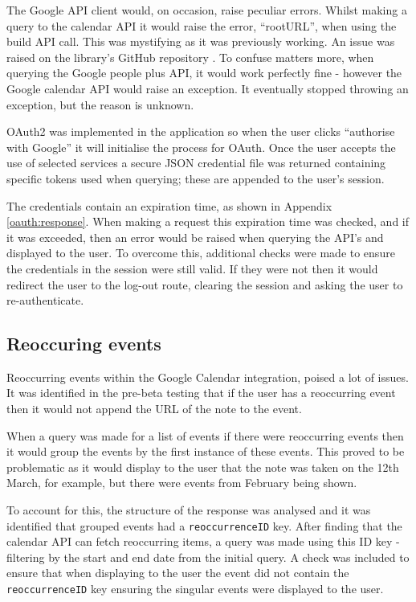 {{{{{{{The Google API client would, on occasion, raise peculiar errors. Whilst making a query to the calendar API it would raise the error, ``rootURL'', when using the build API call. This was mystifying as it was previously working. An issue was raised on the library's GitHub repository \cite{citeulike:14021433}. To confuse matters more, when querying the Google people plus API, it would work perfectly fine - however the Google calendar API would raise an exception. It eventually stopped throwing an exception, but the reason is unknown.

OAuth2 was implemented in the application so when the user clicks ``authorise with Google'' it will initialise the process for OAuth.
Once the user accepts the use of selected services a secure JSON credential file was returned containing specific tokens used when querying; these are appended to the user's session.

The credentials contain an expiration time, as shown in Appendix \ref{oauth:response}. When making a request this expiration time was checked, and if it was exceeded, then an error would be raised when querying the API's and displayed to the user. To overcome this, additional checks were made to ensure the credentials in the session were still valid. If they were not then it would redirect the user to the log-out route, clearing the session and asking the user to re-authenticate.

\subsection{Reoccuring events}
Reoccurring events within the Google Calendar integration, poised a lot of issues. It was identified in the pre-beta testing that if the user has a reoccurring event then it would not append the URL of the note to the event.

When a query was made for a list of events if there were reoccurring events then it would group the events by the first instance of these events. This proved to be problematic as it would display to the user that the note was taken on the 12th March, for example, but there were events from February being shown.

To account for this, the structure of the response was analysed and it was identified that grouped events had a \texttt{reoccurrenceID} key. After finding that the calendar API can fetch reoccurring items, a query was made using this ID key - filtering by the start and end date from the initial query. A check was included to ensure that when displaying to the user the event did not contain the \texttt{reoccurrenceID} key ensuring the singular events were displayed to the user.

}}}}}}}
